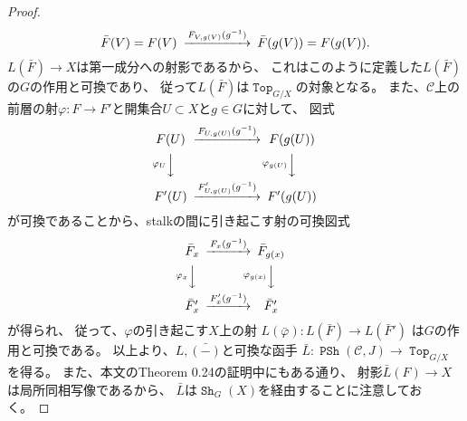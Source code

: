 \documentclass[uplatex]{jsarticle}
\theoremstyle{definition}
\def\mcC{\mathcal{C}}
\DeclareMathOperator{\sfTop}{\mathtt{Top}}
\DeclareMathOperator{\Sh}{\mathtt{Sh}}
\DeclareMathOperator{\PSh}{\mathtt{PSh}}
\begin{document}
\begin{proof}
\[\begin{CD}
    \bar{F}(V) = F(V) @>F_{V,g(V)}(g^{-1})>> \bar{F}(g(V)) = F(g(V)).
  \end{CD}
  \]
  \(L(\bar{F})\to X\)は第一成分への射影であるから、
  これはこのように定義した\(L(\bar{F})\)の\(G\)の作用と可換であり、
  従って\(L(\bar{F})\)は\(\sfTop_{G/X}\)の対象となる。
  また、\(\mcC\)上の前層の射\(\varphi: F\to F'\)と開集合\(U\subset X\)と\(g\in G\)に対して、
  図式
  \[
  \begin{CD}
    F(U) @>F_{U,g(U)}(g^{-1})>> F(g(U)) \\
    @V\varphi_U VV @V\varphi_{g(U)}VV \\
    F'(U) @>F'_{U,g(U)}(g^{-1})>> F'(g(U))
  \end{CD}
  \]
  が可換であることから、stalkの間に引き起こす射の可換図式
  \[
  \begin{CD}
    \bar{F}_x @>F_x(g^{-1})>> \bar{F}_{g(x)} \\
    @V\varphi_x VV @V\varphi_{g(x)}VV \\
    \bar{F}'_x @>F'_x(g^{-1})>> \bar{F}'_x
  \end{CD}
  \]
  が得られ、
  従って、\(\varphi\)の引き起こす\(X\)上の射
  \(L(\bar{\varphi}): L(\bar{F})\to L(\bar{F}')\)
  は\(G\)の作用と可換である。
  以上より、\(L,\bar{(-)}\)と可換な函手
  \(\bar{L}:\PSh(\mcC,J) \to \sfTop_{G/X}\)を得る。
  また、本文のTheorem 0.24の証明中にもある通り、
  射影\(\bar{L}(F)\to X\)は局所同相写像であるから、
  \(\bar{L}\)は\(\Sh_G(X)\)を経由することに注意しておく。


\end{proof}
\end{document}
